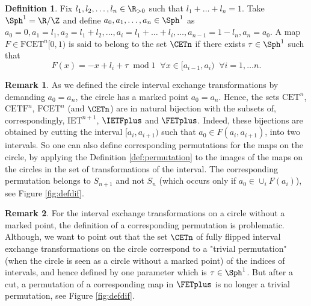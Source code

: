 \documentclass[12pt]{article}
\theoremstyle{definition}
\newtheorem{definition}{Definition}
\newtheorem*{remark}{Remark}
\begin{document}
\begin{definition}\label{def:CETCET}
Fix $l_1, l_2, \ldots, l_n \in  \R_{>0}$ such that $l_1+\ldots+l_n=1$. Take $\Sph^1=\R / \Z$ and define $a_0, a_1, \ldots, a_n \in \Sph^1$ as $a_0=0, a_1=l_1, a_2=l_1+l_2, \ldots, a_i=l_1+\ldots+l_i, \ldots, a_{n-1}=1-l_n, a_n=a_0$. 
A map $F\in \mathrm{FCET}^n [0,1)$ is said to belong to the set $\CETn$ if there exists $\tau \in \Sph^1$ such that
\begin{equation*}
F(x)=      -x+l_i +\tau   \;  \; \mathrm{mod}\; 1 \; \; \forall x \in [a_{i-1}, a_i) \; \; \forall i =1, \ldots n.
\end{equation*}
\end{definition}

\begin{remark}\label{remark:CET_as_IET_plus_one}
As we defined the circle interval exchange transformations by demanding $a_0=a_n$, the circle has a marked point $a_0=a_n$. Hence, the sets
 $\mathrm{CET}^n$, $\mathrm{CETF}^n$, $\mathrm{FCET}^n$ (and $\CETn$) are in natural bijection with the subsets of, correspondingly, $\mathrm{IET}^{n+1}$, $\IETFplus$ and $\FETplus$. Indeed, these bijections are obtained by cutting the interval $[a_i, a_{i+1})$ such that $a_0 \in F(a_i, a_{i+1})$, into two intervals. So one can also define corresponding permutations for the maps on the circle, by applying the Definition \ref{def:permutation} to the images of the maps on the circles in the set of transformations of the interval. The corresponding permutation belongs to $S_{n+1}$ and not $S_n$ (which occurs only if $a_0 \in \cup_i F(a_i)$), see Figure \ref{fig:defdif}. 
\end{remark}

\begin{remark}
For the interval exchange transformations on a circle without a marked point, the definition of a corresponding permutation is problematic. Although, we want to point out that the set $\CETn$ of fully flipped interval exchange transformations on the circle correspond to a "trivial permutation"(when the circle is seen as a circle without a marked point) of the indices of intervals, and hence defined by one parameter which is $\tau \in \Sph^1$. But after a cut, a permutation of a corresponding map in $\FETplus$ is no longer a trivial permutation, see Figure \ref{fig:defdif}.
\end{remark}
\end{document}
